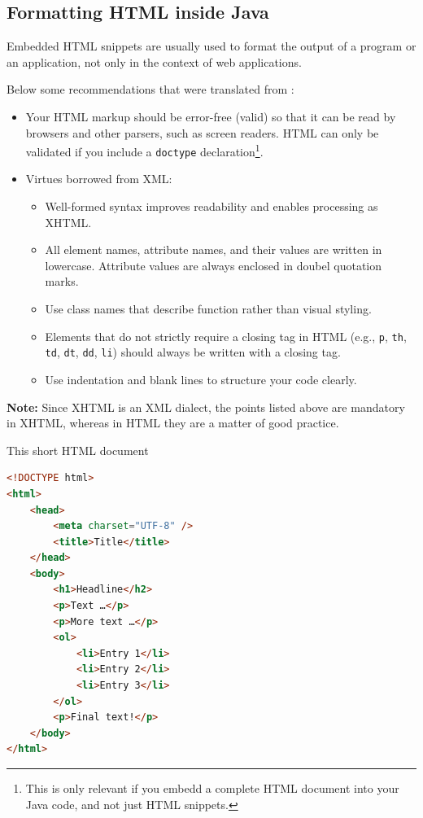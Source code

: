 \subsection{Formatting HTML inside Java}\label{sec:FormattingHTMLInsideJava}
Embedded HTML snippets are usually used to format the output of a program or an application, not only in the context of web applications.

Below some recommendations that were translated from \autocite{selfHTML:GuterHTMLStil}:
\begin{itemize}
	\item{Your HTML markup should be error-free (valid) so that it can be read by browsers and other parsers, such as screen readers. HTML can only be validated if you include a \verb#doctype# declaration\footnote{This is only relevant if you embedd a complete HTML document into your Java code, and not just HTML snippets.}.} 
	\item{Virtues borrowed from XML: 
		\begin{itemize}
			\item{Well-formed syntax improves readability and enables processing as XHTML.}
			\item{All element names, attribute names, and their values are written in lowercase. Attribute values are always enclosed in doubel quotation marks.}
			\item{Use  class names that describe function rather than visual styling.} 
			\item{Elements that do not strictly require a closing tag in HTML (e.g., \verb#p#, \verb#th#, \verb#td#, \verb#dt#, \verb#dd#, \verb#li#) should always be written with a closing tag.}
			\item{Use indentation and blank lines to structure your code clearly.}
		\end{itemize}}
\end{itemize}
\textbf{Note:} Since XHTML is an XML dialect, the points listed above are mandatory in XHTML, whereas in HTML they are  a matter of good practice.

This short HTML document
\begin{lstlisting}[language=HTML]
<!DOCTYPE html>
<html>
    <head>
        <meta charset="UTF-8" />
        <title>Title</title>
    </head>
    <body>
        <h1>Headline</h2>
        <p>Text …</p>
        <p>More text …</p>
        <ol>
            <li>Entry 1</li>
            <li>Entry 2</li>
            <li>Entry 3</li>
        </ol>
        <p>Final text!</p>
    </body>
</html>
\end{lstlisting}

